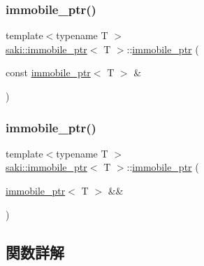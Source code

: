 \subsubsection{\texorpdfstring{immobile\+\_\+ptr()}{immobile\_ptr()}\hspace{0.1cm}{\footnotesize\ttfamily [2/3]}}
{\footnotesize\ttfamily template$<$typename T $>$ \\
\mbox{\hyperlink{classsaki_1_1immobile__ptr}{saki\+::immobile\+\_\+ptr}}$<$ T $>$\+::\mbox{\hyperlink{classsaki_1_1immobile__ptr}{immobile\+\_\+ptr}} (\begin{DoxyParamCaption}\item[{const \mbox{\hyperlink{classsaki_1_1immobile__ptr}{immobile\+\_\+ptr}}$<$ T $>$ \&}]{ }\end{DoxyParamCaption})\hspace{0.3cm}{\ttfamily [delete]}}

\mbox{\label{classsaki_1_1immobile__ptr_a06b9308842f0179d5705caadd90718b0}} 
\subsubsection{\texorpdfstring{immobile\+\_\+ptr()}{immobile\_ptr()}\hspace{0.1cm}{\footnotesize\ttfamily [3/3]}}
{\footnotesize\ttfamily template$<$typename T $>$ \\
\mbox{\hyperlink{classsaki_1_1immobile__ptr}{saki\+::immobile\+\_\+ptr}}$<$ T $>$\+::\mbox{\hyperlink{classsaki_1_1immobile__ptr}{immobile\+\_\+ptr}} (\begin{DoxyParamCaption}\item[{\mbox{\hyperlink{classsaki_1_1immobile__ptr}{immobile\+\_\+ptr}}$<$ T $>$ \&\&}]{ }\end{DoxyParamCaption})\hspace{0.3cm}{\ttfamily [delete]}}



\subsection{関数詳解}
\mbox{\label{classsaki_1_1immobile__ptr_a50dadf5f0d26f517543df590ede03acd}} 

